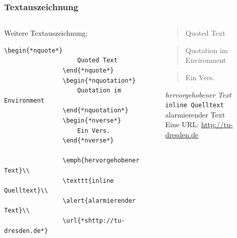\documentclass[german,notoc]{tudbeamer}%
\begin{document}
\begin{frame}[fragile]
	\frametitle{Textauszeichnung}

	\begin{columns}[T,onlytextwidth]
		\begin{column}{.475\textwidth}
			Weitere Textauszeichnung:
			\begin{lstlisting}[gobble=8,style=latex]
				\begin{*nquote*}
					Quoted Text
				\end{*nquote*}
				\begin{*nquotation*}
					Quotation im Environment
				\end{*nquotation*}
				\begin{*nverse*}
					Ein Vers.
				\end{*nverse*}

				\emph{hervorgehobener Text}\\
				\texttt{inline Quelltext}\\
				\alert{alarmierender Text}\\
				\url{*shttp://tu-dresden.de*}
			\end{lstlisting} 
		\end{column}
		\begin{column}{.475\textwidth}
			\begin{quote}
				Quoted Text
			\end{quote}
			\begin{quotation}
				Quotation im Environment
			\end{quotation}
			\begin{verse}
				Ein Vers.
			\end{verse}

			\emph{hervorgehobener Text}\\
			\texttt{inline Quelltext}\\
			\alert{alarmierender Text}\\
			Eine URL: \url{http://tu-dresden.de}
		\end{column}
	\end{columns}
\end{frame}
\end{document}
